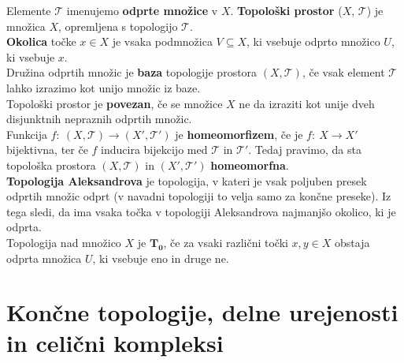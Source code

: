 \documentclass[a4paper, 12pt]{book}
\theoremstyle{definition}
\theoremstyle{remark}
\begin{document}
Elemente $\mathcal{T}$ imenujemo \textbf{odprte množice} v $X$. \textbf{Topološki prostor}
($X$, $\mathcal{T}$) je množica $X$, opremljena s topologijo $\mathcal{T}$.\\
\textbf{Okolica} točke $x \in X$ je vsaka podmnožica $V \subseteq X$, ki vsebuje
odprto množico $U$, ki vsebuje $x$.\\
Družina odprtih množic je \textbf{baza} topologije prostora $(X,\mathcal{T})$, če 
vsak element $\mathcal{T}$ lahko izrazimo kot unijo množic iz baze.\\
Topološki prostor je \textbf{povezan}, če se množice $X$ ne da izraziti kot unije
dveh disjunktnih nepraznih odprtih množic.\\
Funkcija $f:\ (X,\mathcal{T}) \rightarrow (X',\mathcal{T}')$ je \textbf{homeomorfizem}, če je
$f:\ X \rightarrow X'$ bijektivna, ter če $f$ inducira bijekcijo med $\mathcal{T}$ in $\mathcal{T}'$.
Tedaj pravimo, da sta topološka prostora $(X,\mathcal{T})$ in $(X',\mathcal{T}')$ \textbf{homeomorfna}.\\
\textbf{Topologija Aleksandrova} je topologija, v kateri je vsak poljuben presek odprtih
množic odprt (v navadni topologiji to velja samo za končne preseke). Iz tega sledi,
da ima vsaka točka v topologiji Aleksandrova najmanjšo okolico, ki je odprta.\\
Topologija nad množico $X$ je $\mathbf{T_0}$, če za vsaki različni točki $x,y \in X$
obstaja odprta množica $U$, ki vsebuje eno in druge ne.

\chapter{Končne topologije, delne urejenosti in celični kompleksi}
\end{document}
